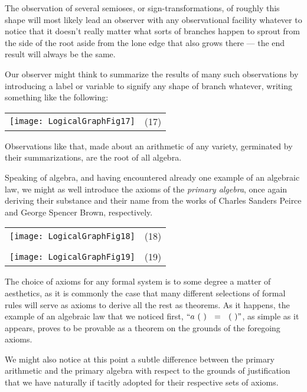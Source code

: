 \documentclass[12pt]{article}
\begin{document}
The observation of several semioses, or sign-transformations, of roughly this shape will most likely lead an observer with any observational facility whatever to notice that it doesn't really matter what sorts of branches happen to sprout from the side of the root aside from the lone edge that also grows there --- the end result will always be the same.

Our observer might think to summarize the results of many such observations by introducing a label or variable to signify any shape of branch whatever, writing something like the following:

\begin{center}\begin{tabular}{cc}
\texttt{[image: LogicalGraphFig17]} & (17) \\
\end{tabular}\end{center}

Observations like that, made about an arithmetic of any variety, germinated by their summarizations, are the root of all algebra.

Speaking of algebra, and having encountered already one example of an algebraic law, we might as well introduce the axioms of the \textit{primary algebra}, once again deriving their substance and their name from the works of Charles Sanders Peirce and George Spencer Brown, respectively.

\begin{center}\begin{tabular}{cc}
\texttt{[image: LogicalGraphFig18]} & (18) \\
\\
\texttt{[image: LogicalGraphFig19]} & (19) \\
\end{tabular}\end{center}

The choice of axioms for any formal system is to some degree a matter of aesthetics, as it is commonly the case that many different selections of formal rules will serve as axioms to derive all the rest as theorems.  As it happens, the example of an algebraic law that we noticed first, $``a~(~)~~=~~(~)"$, as simple as it appears, proves to be provable as a theorem on the grounds of the foregoing axioms.

We might also notice at this point a subtle difference between the primary arithmetic and the primary algebra with respect to the grounds of justification that we have naturally if tacitly adopted for their respective sets of axioms.
\end{document}
